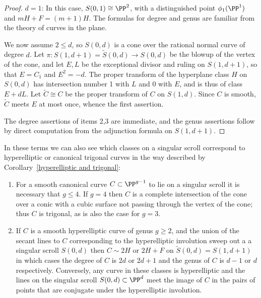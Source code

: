 \begin{proof}
\noindent $d=1$: In this case, $S(0,1)\cong \PP^{2}$, with a distinguished point $\phi_{1}(\PP^{1})$ and $mH+F = (m+1)H$.
The formulas for degree and genus are familiar from the theory of curves in the plane. 

We now assume $2\leq d$, so $S(0,d)$ is a cone over the rational normal curve of degree $d$. Let $\pi: S(1,d+1) = \widetilde S(0,d) \to S(0,d)$
be the blowup of the vertex of the cone, and let $E,L$ be the exceptional divisor and ruling on $S(1, d+1)$,
so that $E = C_{1}$ and $E^{2} = -d$. The proper transform of the hyperplane class $H$ on $S(0,d)$ has intersection number 1 with $L$ and $0$ with $E$,
and is thus of class $E+dL$. Let $\widetilde C \cong C$ be the proper transform of $C$ on $S(1,d)$.
Since $C$ is smooth, $\widetilde C$ meets $E$ at most once, whence the first assertion. 

The degree assertions of items 2,3 are immediate, and the genus assertions follow by direct computation from the 
adjunction formula on $S(1,d+1)$.
\end{proof}

In these terms we can also see which classes on a singular scroll correspond to hyperelliptic or canonical trigonal curves in the way described by Corollary~\ref{hyperelliptic and trigonal}:

\begin{corollary}\label{which class}
\begin{enumerate}
\item For a smooth canonical curve $C\subset \PP^{g-1}$ to lie on a singular scroll it is necessary that $g\leq 4$.
If $g=4$ then $C$ is a complete intersection of the cone over a conic with a cubic surface not passing through
the vertex of the cone; thus $C$ is trigonal, as is also the case for $g=3$.

\item If  $C$ is a smooth hyperelliptic curve of genus $g\geq 2$, and the union of the secant lines to $C$ corresponding to the
hyperelliptic involution sweep out a a singular scroll $S(0,d)$ then $C\sim 2H$ or $2H+F$ on $\widetilde S(0,d) = S(1,d+1)$ in which cases
the degree of $C$ is $2d$ or $2d+1$ and the genus of $C$ is $d-1$ or $d$ respectively. Conversely, 
any  curve in these classes is hyperelliptic and the lines on the singular scroll  $S(0,d)\subset \PP^{d}$ 
meet the image of $C$ in the pairs of points that are conjugate under the hyperelliptic involution.
\end{enumerate}
\end{corollary}

